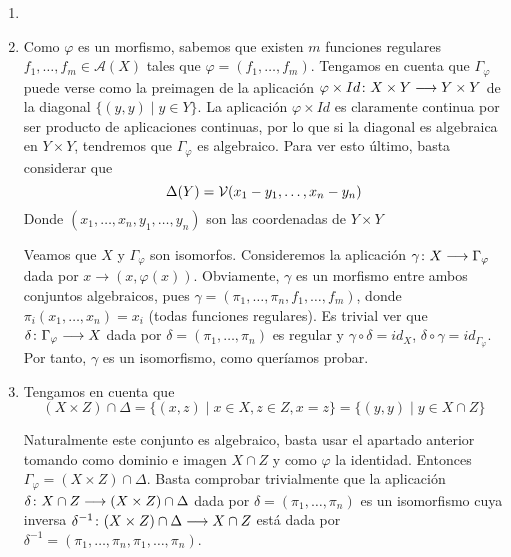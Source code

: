 \documentclass[twoside]{article}
\begin{document}
\begin{solucion}
\begin{enumerate}
\item[]
\item Como $\varphi$ es un morfismo, sabemos que existen $m$ funciones regulares $f_1,\dotsc, f_m \in \mathcal{A}(X)$ tales que $\varphi = (f_1,\dotsc,f_m)$. Tengamos en cuenta que $\Gamma_\varphi$ puede verse como la preimagen de la aplicación $\varphi\times Id \colon{X\times Y}\longrightarrow{Y\times Y}$ de la diagonal $\{(y,y)\mid y\in Y\}$. La aplicación $\varphi \times Id$ es claramente continua por ser producto de aplicaciones continuas, por lo que si la diagonal es algebraica en $Y\times Y$, tendremos que $\Gamma_\varphi$ es algebraico. Para ver esto último, basta considerar que
$$
\Delta(Y) = \mathcal{V}(x_1-y_1,\dotsc,x_n-y_n)
$$
Donde $(x_1,\dotsc,x_n,y_1,\dotsc,y_n)$ son las coordenadas de $Y\times Y$



Veamos que $X$ y $\Gamma_\varphi$ son isomorfos. Consideremos la aplicación $\gamma\colon{X}\longrightarrow{\Gamma_\varphi}$ dada por $x\to (x,\varphi(x))$. Obviamente, $\gamma$ es un morfismo entre ambos conjuntos algebraicos, pues $\gamma = (\pi_1,\dotsc,\pi_n,f_1,\dotsc,f_m)$, donde $\pi_i(x_1,\dotsc,x_n)=x_i$ (todas funciones regulares). Es trivial ver que $\delta\colon{\Gamma_\varphi}\longrightarrow{X}$ dada por $\delta = (\pi_1,\dotsc,\pi_n)$ es regular y $\gamma \circ \delta = id_X$, $\delta \circ \gamma = id_{\Gamma_\varphi}$. Por tanto, $\gamma$ es un isomorfismo, como queríamos probar.
\item Tengamos en cuenta que 
$$
(X\times Z)\cap \Delta = \{(x,z)\mid x\in X, z\in Z, x=z\} = \{(y,y)\mid y\in X\cap Z\} 
$$

Naturalmente este conjunto es algebraico, basta usar el apartado anterior tomando como dominio e imagen $X\cap Z$ y como $\varphi$ la identidad. Entonces $\Gamma_\varphi = (X\times Z)\cap \Delta$. Basta comprobar trivialmente que la aplicación $\delta\colon{X\cap Z}\longrightarrow{(X\times Z)\cap \Delta}$ dada por $\delta = (\pi_1,\dotsc,\pi_n)$ es un isomorfismo cuya inversa $\delta^{-1}\colon{(X\times Z)\cap \Delta}\longrightarrow{X\cap Z}$ está dada por $\delta^{-1}=(\pi_1,\dotsc,\pi_n,\pi_1,\dotsc,\pi_n)$.
\end{enumerate}

\end{solucion}
\newpage 
\end{document}

